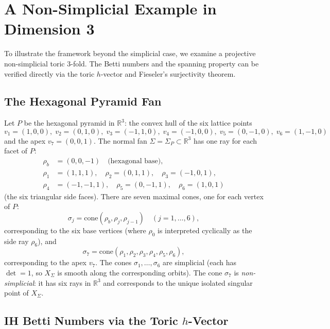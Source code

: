 \documentclass[12pt,reqno]{amsart}
\theoremstyle{plain}
\theoremstyle{definition}
\newcommand{\IR}{\mathbb{R}}
\begin{document}
	\section{A Non-Simplicial Example in Dimension 3}
	
	To illustrate the framework beyond the simplicial case, we examine a projective non-simplicial toric $3$-fold. The Betti numbers and the spanning property can be verified directly via the toric $h$-vector and Fieseler's surjectivity theorem.
	
	\subsection{The Hexagonal Pyramid Fan}
	
	Let $P$ be the hexagonal pyramid in $\IR^3$: the convex hull of the six lattice points
	\[
	v_1=(1,0,0),\; v_2=(0,1,0),\; v_3=(-1,1,0),\; v_4=(-1,0,0),\; v_5=(0,-1,0),\; v_6=(1,-1,0)
	\]
	and the apex $v_7=(0,0,1)$. The normal fan $\Sigma = \Sigma_P \subset \IR^3$ has one ray for each facet of $P$:
	\begin{align*}
		\rho_b &= (0,0,-1) \quad \text{(hexagonal base)}, \\
		\rho_1 &= (1,1,1),\quad \rho_2 = (0,1,1),\quad \rho_3 = (-1,0,1), \\
		\rho_4 &= (-1,-1,1),\quad \rho_5 = (0,-1,1),\quad \rho_6 = (1,0,1)
	\end{align*}
	(the six triangular side faces). There are seven maximal cones, one for each vertex of $P$:
	\[
	\sigma_j = \mathrm{cone}(\rho_b, \rho_j, \rho_{j-1}) \quad (j=1,\dots,6),
	\]
	corresponding to the six base vertices (where $\rho_0$ is interpreted cyclically as the side ray $\rho_6$), and
	\[
	\sigma_7 = \mathrm{cone}(\rho_1, \rho_2, \rho_3, \rho_4, \rho_5, \rho_6),
	\]
	corresponding to the apex $v_7$. The cones $\sigma_1,\dots,\sigma_6$ are simplicial (each has $\det = 1$, so $X_\Sigma$ is smooth along the corresponding orbits). The cone $\sigma_7$ is \emph{non-simplicial}: it has six rays in $\IR^3$ and corresponds to the unique isolated singular point of $X_\Sigma$.
	
	\subsection{IH Betti Numbers via the Toric $h$-Vector}
	
\end{document}
